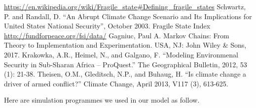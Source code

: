 \documentclass{mcmthesis}
\begin{document}
	\begin{thebibliography}{99}
		\url{https://en.wikipedia.org/wiki/Fragile_state#Defining_fragile_states}
		 Schwartz, P. and Randall, D. “An Abrupt Climate Change Scenario and Its Implications for United States National Security”, October 2003.
		 Fragile State Index \url{http://fundforpeace.org/fsi/data/}
		 Gagniuc, Paul A. Markov Chains: From Theory to Implementation and Experimentation. USA, NJ: John Wiley \& Sons, 2017.
		 Krakowka, A.R., Heimel, N., and Galgano, F. “Modeling Environmenal Security in Sub-Sharan Africa – ProQuest.” The Geographical Bulletin, 2012, 53 (1): 21-38.
		 Theisen, O.M., Gleditsch, N.P., and Buhaug, H. “Is climate change a driver of armed conflict?” Climate Change, April 2013, V117 (3), 613-625.
	\end{thebibliography}
	
	\newpage
	\begin{appendices}
		
		Here are simulation programmes we used in our model as follow.
		
		
		
		
		
		
		
		
		
		
%		
	\end{appendices}
\end{document}
